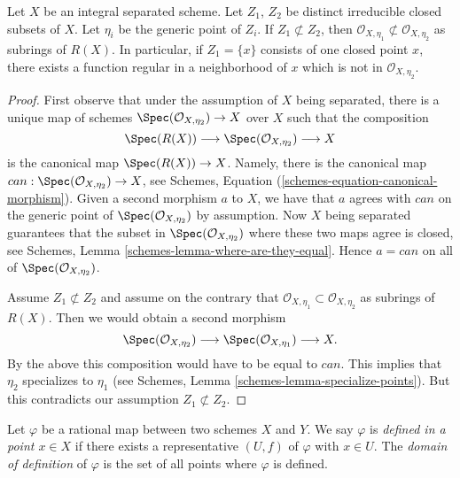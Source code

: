 \begin{lemma}
\label{lemma-distinct-local-rings}
Let $X$ be an integral separated scheme.
Let $Z_1$, $Z_2$ be distinct irreducible closed subsets of $X$.
Let $\eta_i$ be the generic point of $Z_i$.
If $Z_1 \not\subset Z_2$, then
$\mathcal{O}_{X, \eta_1} \not \subset \mathcal{O}_{X, \eta_2}$
as subrings of $R(X)$.
In particular, if $Z_1 = \{x\}$ consists of one closed point $x$,
there exists a function regular in a neighborhood of $x$
which is not in $\mathcal{O}_{X, \eta_{2}}$.
\end{lemma}

\begin{proof}
First observe that under the assumption of $X$ being separated,
there is a unique map of schemes
$\Spec(\mathcal{O}_{X, \eta_2}) \to X$ over $X$
such that the composition
$$
\Spec(R(X)) \longrightarrow
\Spec(\mathcal{O}_{X, \eta_2}) \longrightarrow X
$$
is the canonical map $\Spec(R(X)) \to X$.
Namely, there is the canonical map
$can : \Spec(\mathcal{O}_{X, \eta_2}) \to X$, see
Schemes, Equation (\ref{schemes-equation-canonical-morphism}).
Given a second morphism $a$ to $X$, we have that $a$ agrees with $can$
on the generic point of
$\Spec(\mathcal{O}_{X, \eta_2})$ by assumption.
Now $X$ being separated guarantees that the subset in
$\Spec(\mathcal{O}_{X, \eta_2})$ where
these two maps agree is closed, see
Schemes, Lemma \ref{schemes-lemma-where-are-they-equal}.
Hence $a = can$ on all of $\Spec(\mathcal{O}_{X, \eta_2})$.

\medskip\noindent
Assume $Z_1 \not \subset Z_2$ and assume on the contrary that
$\mathcal{O}_{X, \eta_{1}} \subset \mathcal{O}_{X, \eta_{2}}$
as subrings of $R(X)$. Then we would obtain a second morphism
$$
\Spec(\mathcal{O}_{X, \eta_{2}}) \longrightarrow
\Spec(\mathcal{O}_{X, \eta_{1}}) \longrightarrow
X.
$$
By the above this composition would have to be equal to $can$.
This implies that $\eta_2$ specializes to $\eta_1$ (see
Schemes, Lemma \ref{schemes-lemma-specialize-points}).
But this contradicts our assumption $Z_1 \not \subset Z_2$.
\end{proof}

\begin{definition}
\label{definition-domain-of-definition}
Let $\varphi$ be a rational map between two schemes $X$ and $Y$. We say
$\varphi$ is {\it defined in a point $x \in X$} if there exists a
representative $(U, f)$ of $\varphi$ with $x \in U$. The
{\it domain of definition} of $\varphi$ is the set of all points
where $\varphi$ is defined.
\end{definition}

